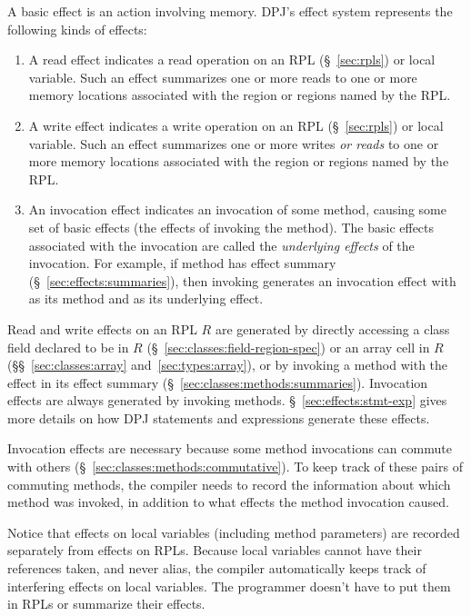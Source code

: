A basic effect is an action involving memory.  DPJ's effect system
represents the following kinds of effects:
%
\begin{enumerate}
%
\item {} A read effect indicates a read operation
  on an RPL (\S~\ref{sec:rpls}) or local variable.  Such an effect
  summarizes one or more reads to one or more memory locations
  associated with the region or regions named by the RPL.
%
\item {} A write effect indicates a write operation
  on an RPL (\S~\ref{sec:rpls}) or local variable.  Such an effect
  summarizes one or more writes \emph{or reads} to one or more memory
  locations associated with the region or regions named by the RPL.
%
\item {} An invocation effect indicates an
  invocation of some method, causing some set of basic effects (the
  effects of invoking the method).  The basic effects associated with
  the invocation are called the \emph{underlying effects} of the
  invocation.  For example, if method  has effect summary
   (\S~\ref{sec:effects:summaries}), then invoking
   generates an invocation effect with  as its method
  and  as its underlying effect.
%
\end{enumerate}

Read and write effects on an RPL $R$ are generated by directly
accessing a class field declared to be in $R$
(\S~\ref{sec:classes:field-region-spec}) or an array cell in $R$
(\S\S~\ref{sec:classes:array} and~\ref{sec:types:array}), or by
invoking a method with the effect in its effect summary
(\S~\ref{sec:classes:methods:summaries}).  Invocation effects are
always generated by invoking methods.  \S~\ref{sec:effects:stmt-exp}
gives more details on how DPJ statements and expressions generate
these effects.

Invocation effects are necessary because some method invocations can
commute with others (\S~\ref{sec:classes:methods:commutative}).  To
keep track of these pairs of commuting methods, the compiler needs to
record the information about which method was invoked, in addition to
what effects the method invocation caused.

Notice that effects on local variables (including method parameters)
are recorded separately from effects on RPLs.  Because local variables
cannot have their references taken, and never alias, the compiler
automatically keeps track of interfering effects on local variables.
The programmer doesn't have to put them in RPLs or summarize their
effects.

